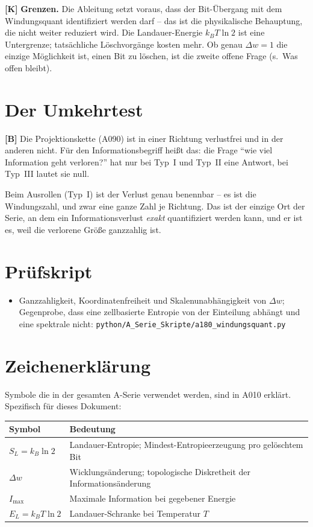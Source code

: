 \textbf{[K]} \textbf{Grenzen.} Die Ableitung setzt voraus, dass der Bit-Übergang
mit dem Windungsquant identifiziert werden darf -- das ist die physikalische
Behauptung, die nicht weiter reduziert wird. Die Landauer-Energie $k_BT\ln2$
ist eine Untergrenze; tatsächliche Löschvorgänge kosten mehr. Ob genau $\Delta
w=1$ die einzige Möglichkeit ist, einen Bit zu löschen, ist die zweite offene Frage
(s.\ Was offen bleibt).

\section{Der Umkehrtest}

\textbf{[B]} Die Projektionskette (A090) ist in einer Richtung verlustfrei und
in der anderen nicht. Für den Informationsbegriff heißt das: die Frage
\enquote{wie viel Information geht verloren?} hat nur bei Typ~I und Typ~II eine
Antwort, bei Typ~III lautet sie null.

Beim Ausrollen (Typ~I) ist der Verlust genau benennbar -- es ist die
Windungszahl, und zwar eine ganze Zahl je Richtung. Das ist der einzige Ort der
Serie, an dem ein Informationsverlust \emph{exakt} quantifiziert werden kann,
und er ist es, weil die verlorene Größe ganzzahlig ist.

\section{Prüfskript}

\begin{itemize}
  \item Ganzzahligkeit, Koordinatenfreiheit und Skalenunabhängigkeit von
    $\Delta w$; Gegenprobe, dass eine zellbasierte Entropie von der
    Einteilung abhängt und eine spektrale nicht:
    \texttt{python/A\_Serie\_Skripte/a180\_windungsquant.py}
\end{itemize}


\section{Zeichenerklärung}

Symbole die in der gesamten A-Serie verwendet werden, sind in A010 erklärt.
Spezifisch für dieses Dokument:

\begin{center}
\renewcommand{\arraystretch}{1.3}
{\small\begin{tabular}{lp{9cm}}
\toprule
Symbol & Bedeutung \\
\midrule
$S_L = k_B\ln 2$ & Landauer-Entropie; Mindest-Entropieerzeugung pro gelöschtem Bit \\
$\Delta w$ & Wicklungsänderung; topologische Diskretheit der Informationsänderung \\
$I_\text{max}$ & Maximale Information bei gegebener Energie \\
$E_L = k_BT\ln 2$ & Landauer-Schranke bei Temperatur $T$ \\
\bottomrule
\end{tabular}}
\renewcommand{\arraystretch}{1.0}
\end{center}


